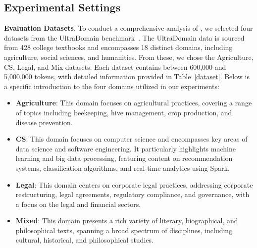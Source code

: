 \subsection{Experimental Settings}
\textbf{Evaluation Datasets}.
To conduct a comprehensive analysis of \model, we selected four datasets from the UltraDomain benchmark~\citep{qian2024memorag}. The UltraDomain data is sourced from 428 college textbooks and encompasses 18 distinct domains, including agriculture, social sciences, and humanities. From these, we chose the Agriculture, CS, Legal, and Mix datasets. Each dataset contains between 600,000 and 5,000,000 tokens, with detailed information provided in Table~\ref{dataset}. Below is a specific introduction to the four domains utilized in our experiments:
\begin{itemize}[leftmargin=*]
    \item \textbf{Agriculture}: This domain focuses on agricultural practices, covering a range of topics including beekeeping, hive management, crop production, and disease prevention.
    
    \item  \textbf{CS}: This domain focuses on computer science and encompasses key areas of data science and software engineering. It particularly highlights machine learning and big data processing, featuring content on recommendation systems, classification algorithms, and real-time analytics using Spark.
    
    \item \textbf{Legal}: This domain centers on corporate legal practices, addressing corporate restructuring, legal agreements, regulatory compliance, and governance, with a focus on the legal and financial sectors.
    
    \item \textbf{Mixed}: This domain presents a rich variety of literary, biographical, and philosophical texts, spanning a broad spectrum of disciplines, including cultural, historical, and philosophical studies.
\end{itemize}

